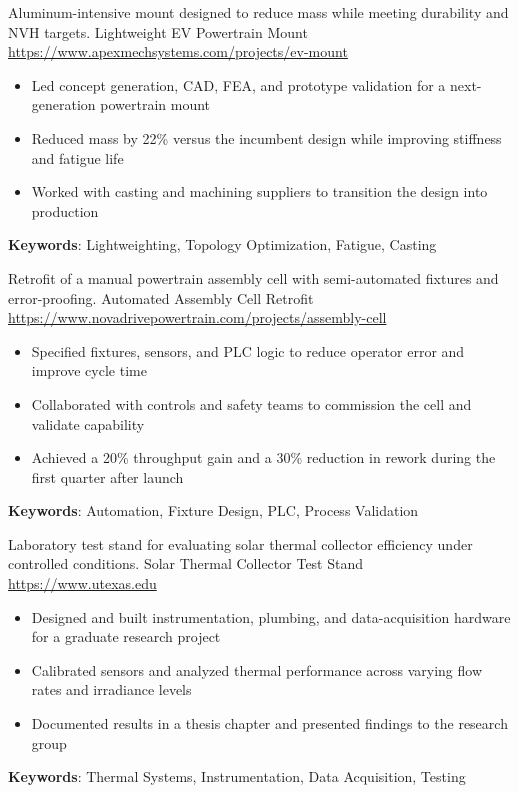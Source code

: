 \documentclass[a4paper, serif, 10pt]{moderncv}
\begin{document}
        {Aluminum-intensive mount designed to reduce mass while meeting durability and NVH targets.}
        {Lightweight EV Powertrain Mount}
        {\url{https://www.apexmechsystems.com/projects/ev-mount}}
        {}
        {\begin{itemize}
\item Led concept generation, CAD, FEA, and prototype validation for a next-generation powertrain mount
\item Reduced mass by 22\% versus the incumbent design while improving stiffness and fatigue life
\item Worked with casting and machining suppliers to transition the design into production
\end{itemize}
\textbf{Keywords}: Lightweighting, Topology Optimization, Fatigue, Casting}

        {Retrofit of a manual powertrain assembly cell with semi-automated fixtures and error-proofing.}
        {Automated Assembly Cell Retrofit}
        {\url{https://www.novadrivepowertrain.com/projects/assembly-cell}}
        {}
        {\begin{itemize}
\item Specified fixtures, sensors, and PLC logic to reduce operator error and improve cycle time
\item Collaborated with controls and safety teams to commission the cell and validate capability
\item Achieved a 20\% throughput gain and a 30\% reduction in rework during the first quarter after launch
\end{itemize}
\textbf{Keywords}: Automation, Fixture Design, PLC, Process Validation}

        {Laboratory test stand for evaluating solar thermal collector efficiency under controlled conditions.}
        {Solar Thermal Collector Test Stand}
        {\url{https://www.utexas.edu}}
        {}
        {\begin{itemize}
\item Designed and built instrumentation, plumbing, and data-acquisition hardware for a graduate research project
\item Calibrated sensors and analyzed thermal performance across varying flow rates and irradiance levels
\item Documented results in a thesis chapter and presented findings to the research group
\end{itemize}
\textbf{Keywords}: Thermal Systems, Instrumentation, Data Acquisition, Testing}
\end{document}
